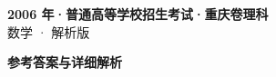 \documentclass[zihao=-4, a4paper]{ctexart}
\begin{document}
\begin{center}
  {\Large\bfseries 2006 年·普通高等学校招生考试·重庆卷理科}\\[4pt]
  {\large 数学 · 解析版}
\end{center}
\medskip
{}

\clearpage
{}
\begin{center}{\Large\bfseries 参考答案与详细解析}\end{center}
\medskip

\end{document}

